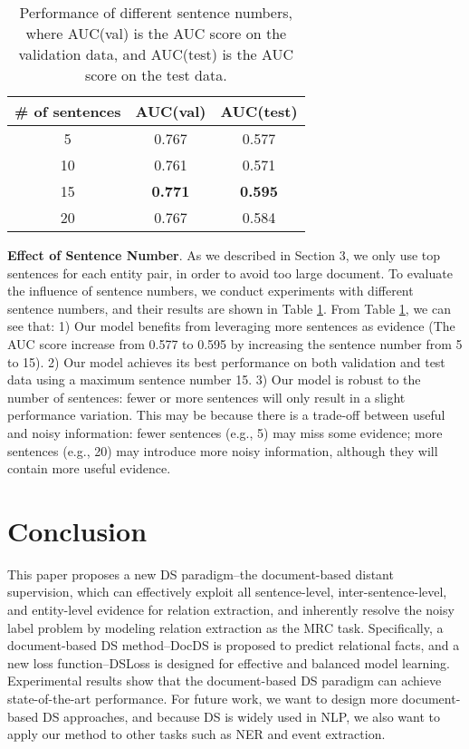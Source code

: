 \documentclass[11pt,a4paper]{article}
\begin{document}
  \begin{table}[!tbp]
    \setlength{\belowcaptionskip}{-1em}
    \centering
      \begin{tabular}{ccc}
      \toprule
      \# of sentences & AUC(val) & AUC(test) \\
      \midrule
      5     & 0.767 &  0.577 \\
      10    & 0.761 & 0.571 \\
      15    & \textbf{0.771}  & \textbf{0.595} \\
      20    & 0.767 &  0.584 \\
      \bottomrule
      \end{tabular}\caption{Performance of different sentence numbers, where AUC(val) is the AUC score on the validation data, and AUC(test) is the AUC score on the test data.}
    \label{tab:sentence}\end{table}

  \textbf{Effect of Sentence Number}.
  As we described in Section 3, we only use top  sentences for each entity pair, in order to avoid too large document.
  To evaluate the influence of sentence numbers,
  we conduct experiments with different sentence numbers, and their results are shown in Table \ref{tab:sentence}.
  From Table \ref{tab:sentence}, we can see that:
  1) Our model benefits from leveraging more sentences as evidence (The AUC score increase from 0.577 to 0.595 by increasing the sentence number from 5 to 15).
  2) Our model achieves its best performance on both validation and test data using a maximum sentence number 15.
  3) Our model is robust to the number of sentences: fewer or more sentences will only result in a slight performance variation.
  This may be because there is a trade-off between useful and noisy information:
  fewer sentences (e.g., 5) may miss some evidence; more sentences (e.g., 20) may introduce more noisy information, although they will contain more useful evidence.
  
  \section{Conclusion}
  This paper proposes a new DS paradigm--the document-based distant supervision, which can effectively exploit all sentence-level, inter-sentence-level, and entity-level evidence for relation extraction, and inherently resolve the noisy label problem by modeling relation extraction as the MRC task. Specifically, a document-based DS method--DocDS is proposed to predict relational facts, and a new loss function--DSLoss is designed for effective and balanced model learning. Experimental results show that the document-based DS paradigm can achieve state-of-the-art performance. For future work, we want to design more document-based DS approaches, and because DS is widely used in NLP, we also want to apply our method to other tasks such as NER and event extraction.



\end{document}
